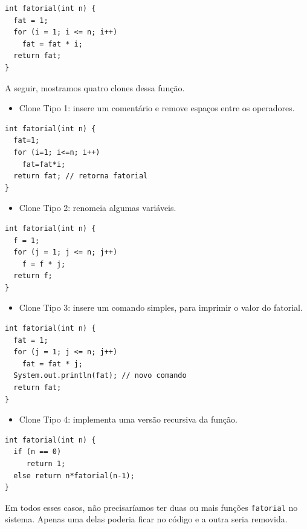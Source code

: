 \documentclass[
  11pt,
  twoside]{book}
\newcommand{\passthrough}[1]{#1}
\providecommand{\tightlist}{%
  \setlength{\itemsep}{0pt}\setlength{\parskip}{0pt}}
\begin{document}
\begin{lstlisting}
int fatorial(int n) {
  fat = 1;
  for (i = 1; i <= n; i++)
    fat = fat * i;
  return fat;
}
\end{lstlisting}

A seguir, mostramos quatro clones dessa função.

\begin{itemize}
\tightlist
\item
  Clone Tipo 1: insere um comentário e remove espaços entre os
  operadores.
\end{itemize}

\begin{lstlisting}
int fatorial(int n) {
  fat=1;
  for (i=1; i<=n; i++) 
    fat=fat*i;
  return fat; // retorna fatorial
}
\end{lstlisting}

\begin{itemize}
\tightlist
\item
  Clone Tipo 2: renomeia algumas variáveis.
\end{itemize}

\begin{lstlisting}
int fatorial(int n) {
  f = 1;
  for (j = 1; j <= n; j++) 
    f = f * j;
  return f; 
}
\end{lstlisting}

\begin{itemize}
\tightlist
\item
  Clone Tipo 3: insere um comando simples, para imprimir o valor do
  fatorial.
\end{itemize}

\begin{lstlisting}
int fatorial(int n) {
  fat = 1;
  for (j = 1; j <= n; j++)
    fat = fat * j;
  System.out.println(fat); // novo comando
  return fat;
}
\end{lstlisting}

\begin{itemize}
\tightlist
\item
  Clone Tipo 4: implementa uma versão recursiva da função.
\end{itemize}

\begin{lstlisting}
int fatorial(int n) {
  if (n == 0)
     return 1;
  else return n*fatorial(n-1);
}
\end{lstlisting}

Em todos esses casos, não precisaríamos ter duas ou mais funções
\passthrough{\lstinline!fatorial!} no sistema. Apenas uma delas poderia
ficar no código e a outra seria removida.
\end{document}
